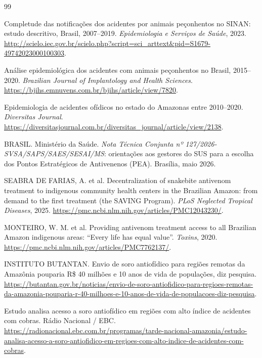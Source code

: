\documentclass[a4paper,12pt]{article}
\begin{document}
\begin{thebibliography}{99}

 Completude das notificações dos acidentes por animais
  peçonhentos no SINAN: estudo descritivo, Brasil, 2007--2019.
  \textit{Epidemiologia e Serviços de Saúde}, 2023.
  \url{http://scielo.iec.gov.br/scielo.php?script=sci_arttext&pid=S1679-49742023000100303}.

 Análise epidemiológica dos acidentes com animais
  peçonhentos no Brasil, 2015--2020. \textit{Brazilian Journal of
  Implantology and Health Sciences}.
  \url{https://bjihs.emnuvens.com.br/bjihs/article/view/7820}.

 Epidemiologia de acidentes ofídicos no estado do
  Amazonas entre 2010--2020. \textit{Diversitas Journal}.
  \url{https://diversitasjournal.com.br/diversitas_journal/article/view/2138}.

 BRASIL. Ministério da Saúde. \textit{Nota Técnica Conjunta
  nº 127/2026-SVSA/SAPS/SAES/SESAI/MS}: orientações aos gestores do SUS para
  a escolha dos Pontos Estratégicos de Antivenenos (PEA). Brasília, maio 2026.

 SEABRA DE FARIAS, A. et al. Decentralization of
  snakebite antivenom treatment to indigenous community health centers in the
  Brazilian Amazon: from demand to the first treatment (the SAVING Program).
  \textit{PLoS Neglected Tropical Diseases}, 2025.
  \url{https://pmc.ncbi.nlm.nih.gov/articles/PMC12043230/}.

 MONTEIRO, W. M. et al. Providing antivenom treatment
  access to all Brazilian Amazon indigenous areas: ``Every life has equal
  value''. \textit{Toxins}, 2020.
  \url{https://pmc.ncbi.nlm.nih.gov/articles/PMC7762137/}.

 INSTITUTO BUTANTAN. Envio de soro antiofídico para
  regiões remotas da Amazônia pouparia R\$ 40 milhões e 10 anos de vida de
  populações, diz pesquisa. \url{https://butantan.gov.br/noticias/envio-de-soro-antiofidico-para-regioes-remotas-da-amazonia-pouparia-r-40-milhoes-e-10-anos-de-vida-de-populacoes-diz-pesquisa}.

 Estudo analisa acesso a soro antiofídico em regiões com
  alto índice de acidentes com cobras. Rádio Nacional / EBC.
  \url{https://radionacional.ebc.com.br/programas/tarde-nacional-amazonia/estudo-analisa-acesso-a-soro-antiofidico-em-regioes-com-alto-indice-de-acidentes-com-cobras}.


\end{thebibliography}
\end{document}
